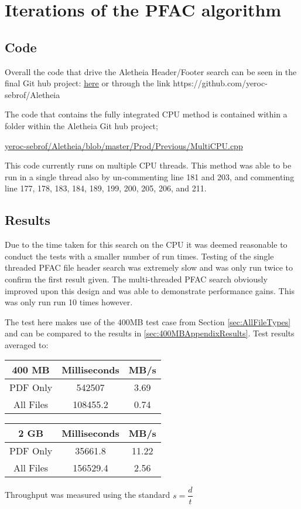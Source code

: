 \section{Iterations of the PFAC algorithm}
\label{sec:PFACappendix}

\subsection{Code}
Overall the code that drive the Aletheia Header/Footer search can be seen in the final Git hub project:
\underline{\href{https://github.com/yeroc-sebrof/Aletheia}{here}} or through the link https://github.com/yeroc-sebrof/Aletheia

The code that contains the fully integrated CPU method is contained within a folder within the Aletheia Git hub project;

\href{https://github.com/yeroc-sebrof/Aletheia/blob/master/Prod/Previous/MultiCPU.cpp}{yeroc-sebrof/Aletheia/blob/master/Prod/Previous/MultiCPU.cpp}

This code currently runs on multiple CPU threads.
This method was able to be run in a single thread also by un-commenting line 181 and 203, and commenting line 177, 178, 183, 184, 189, 199, 200, 205, 206, and 211.

\subsection{Results}
Due to the time taken for this search on the CPU it was deemed reasonable to conduct the tests with a smaller number of run times.
Testing of the single threaded PFAC file header search was extremely slow and was only run twice to confirm the first result given.
The multi-threaded PFAC search obviously improved upon this design and was able to demonstrate performance gains.
This was only run run 10 times however.

The test here makes use of the 400MB test case from Section \ref{sec:AllFileTypes} and can be compared to the results in \ref{sec:400MBAppendixResults}.
Test results averaged to: 

{\centering
\begin{tabular}{c | c | c}
400 MB & Milliseconds & MB/s \\
\hline
PDF Only & 542507 & 3.69 \\
All Files & 108455.2 & 0.74 \\
\end{tabular}
\label{tab:windowsTestSingleCPU}
\par}



{\centering
\begin{tabular}{c | c | c}
2 GB & Milliseconds & MB/s \\
\hline
PDF Only & 35661.8 & 11.22 \\
All Files & 156529.4 & 2.56 \\
\end{tabular}
\label{tab:windowsTestMultiCPU}
\par}

Throughput was measured using the standard $s = \dfrac{d}{t}$

